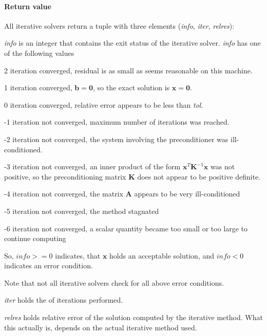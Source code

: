 \documentclass[a4paper]{article}
\newcommand{\mat}[1]{\ensuremath{\boldsymbol{#1}}}
\newcommand{\vect}[1]{\ensuremath{\mathbf{#1}}}
\newenvironment{arglist} {\begin{list}{}{\setlength{\leftmargin}{4em}\setlength{\itemsep}{0cm}\setlength{\labelwidth}{3em}}}
  {\end{list}}
\begin{document}
\paragraph{Return value}
%
All iterative solvers return a tuple with three elements
(\textit{info}, \textit{iter}, \textit{relres}):
\begin{arglist}
\item[\textit{info}] is an integer that contains the exit status of
  the iterative solver. \textit{info} has one of the following values
  \begin{list}{}{}
  \item[2] iteration converged, residual is as small as seems
    reasonable on this machine.
  \item[1] iteration converged, $\vect{b} = \vect{0}$, so the exact
    solution is $\vect{x} = \vect{0}$.
    \item[0] iteration converged, relative error appears to be less
      than \textit{tol}.
    \item[-1] iteration not converged, maximum number of iterations
      was reached.
    \item[-2] iteration not converged, the system involving the
      preconditioner was ill-conditioned.
    \item[-3] iteration not converged, an inner product of the form
      $\vect{x}^T \mat{K}^{-1} \vect{x}$ was not positive, so the
      preconditioning matrix $\mat{K}$ does not appear to be positive
      definite.
    \item[-4] iteration not converged, the matrix $\mat{A}$ appears to
      be very ill-conditioned
    \item[-5] iteration not converged, the method stagnated
    \item[-6] iteration not converged, a scalar quantity became too
      small or too large to continue computing
  \end{list}
  So, $\mathit{info} >= 0$ indicates, that $\vect{x}$ holds an
  acceptable solution, and $\mathit{info} < 0$ indicates an error
  condition.

  Note that not all iterative solvers check for all above error
  conditions.
\item[\textit{iter}] holds the of iterations performed.
\item[\textit{relres}] holds relative error of the solution computed
  by the iterative method. What this actually is, depends on the
  actual iterative method used.
\end{arglist}
\end{document}
